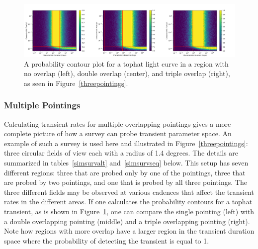 \documentclass[12pt]{article}
\begin{document}
 \begin{figure}
\includegraphics[width=\columnwidth]{threeregion_comboplot.png}
\caption{A probability contour plot for a tophat light curve in a region with no overlap (left), double overlap (center), and triple overlap (right), as seen in Figure~\ref{threepointings}. } 
\label{threeregion}
 \end{figure}

\subsubsection{Multiple Pointings}
Calculating transient rates for multiple overlapping pointings gives a more complete picture of how a survey can probe transient parameter space. An example of such a survey is used here and illustrated in Figure~\ref{threepointings}: three circular fields of view each with a radius of 1.4 degrees. The details are summarized in tables~\ref{simsurvalt} and~\ref{simsurvseq} below. This setup has seven different regions: three that are probed only by one of the pointings, three that are probed by two pointings, and one that is probed by all three pointings. The three different fields may be observed at various cadences that affect the transient rates in the different areas. If one calculates the probability contours for a tophat transient, as is shown in Figure~\ref{threeregion}, one can compare the single pointing (left) with a double overlapping pointing (middle) and a triple overlapping pointing (right). Note how regions with more overlap have a larger region in the transient duration space where the probability of detecting the transient is equal to 1. 
\end{document}
